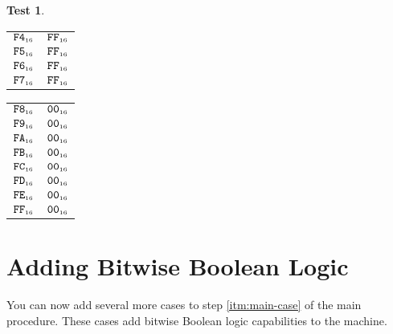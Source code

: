 \documentclass[a4paper,12pt]{article}
\makeatletter
\newcommand{\num}[1]{\texttt{#1}}
\newcommand{\hex}[1]{\num{#1}_{\textup{\tiny 16}}}
\newcommand{\MEM}[1]{\ifthenelse{\equal{#1}{}}{M}{M[#1]}}
\theoremstyle{definition}
\newtheorem{test}{Test}
\newenvironment{memtable}{%
  \begin{trivlist}
    \item
    }{%
    \end{trivlist}}
\newenvironment{memcolumn}{%
  \begin{tabular}{@{}ll@{}}
    \hline}
    {%
    \hline
  \end{tabular}}
\newcommand{\memspace}{\qquad}
\makeatother
\begin{document}
\begin{test}
\begin{memtable}
\begin{memcolumn}
      $\hex{F4}$ & $\hex{FF}$ \\
      $\hex{F5}$ & $\hex{FF}$ \\
      $\hex{F6}$ & $\hex{FF}$ \\
      $\hex{F7}$ & $\hex{FF}$ \\
    \end{memcolumn}
    \memspace
    \begin{memcolumn}
      $\hex{F8}$ & $\hex{00}$ \\
      $\hex{F9}$ & $\hex{00}$ \\
      $\hex{FA}$ & $\hex{00}$ \\
      $\hex{FB}$ & $\hex{00}$ \\
      $\hex{FC}$ & $\hex{00}$ \\
      $\hex{FD}$ & $\hex{00}$ \\
      $\hex{FE}$ & $\hex{00}$ \\
      $\hex{FF}$ & $\hex{00}$ \\
    \end{memcolumn}
  \end{memtable}
\end{test}

\section{Adding Bitwise Boolean Logic}

You can now add several more cases to step \ref{itm:main-case} of the main procedure.
These cases add bitwise Boolean logic capabilities to the machine.
\end{document}
